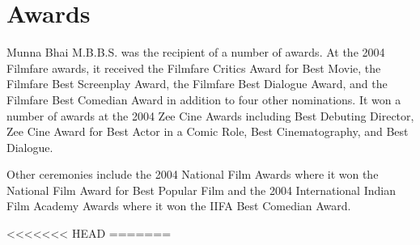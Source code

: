 \documentclass[]{article}
\begin{document}
\section{Awards}
Munna Bhai M.B.B.S. was the recipient of a number of awards. At the 2004 Filmfare awards, it received the Filmfare Critics Award for Best Movie, the Filmfare Best Screenplay Award, the Filmfare Best Dialogue Award, and the Filmfare Best Comedian Award in addition to four other nominations. It won a number of awards at the 2004 Zee Cine Awards including Best Debuting Director, Zee Cine Award for Best Actor in a Comic Role, Best Cinematography, and Best Dialogue.

Other ceremonies include the 2004 National Film Awards where it won the National Film Award for Best Popular Film and the 2004 International Indian Film Academy Awards where it won the IIFA Best Comedian Award.

<<<<<<< HEAD
=======
\end{document}
